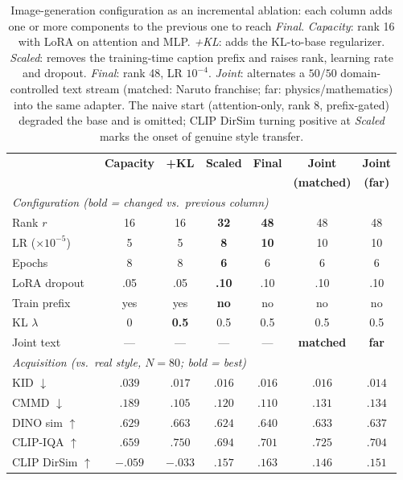 \begin{table}[t]
\centering\small
\setlength{\tabcolsep}{5pt}
\renewcommand{\arraystretch}{1.05}
\begin{tabular}{lcccccc}
\toprule
 & \textbf{Capacity} & \textbf{+KL} & \textbf{Scaled} & \textbf{Final} & \textbf{Joint} & \textbf{Joint} \\
 & & & & & \textbf{(matched)} & \textbf{(far)} \\
\midrule
\multicolumn{7}{l}{\textit{Configuration (bold = changed vs.\ previous column)}}\\
Rank $r$              & 16 & 16 & \textbf{32} & \textbf{48} & 48 & 48 \\
LR ($\times10^{-5}$)  & 5 & 5 & \textbf{8} & \textbf{10} & 10 & 10 \\
Epochs               & 8 & 8 & \textbf{6} & 6 & 6 & 6 \\
LoRA dropout         & .05 & .05 & \textbf{.10} & .10 & .10 & .10 \\
Train prefix         & yes & yes & \textbf{no} & no & no & no \\
KL $\lambda$         & 0 & \textbf{0.5} & 0.5 & 0.5 & 0.5 & 0.5 \\
Joint text           & --- & --- & --- & --- & \textbf{matched} & \textbf{far} \\
\midrule
\multicolumn{7}{l}{\textit{Acquisition (vs.\ real style, $N{=}80$; bold = best)}}\\
KID $\downarrow$       & $.039$ & $.017$ & $.016$ & $.016$ & $.016$ & $\mathbf{.014}$ \\
CMMD $\downarrow$      & $.189$ & $\mathbf{.105}$ & $.120$ & $.110$ & $.131$ & $.134$ \\
DINO sim $\uparrow$    & $.629$ & $\mathbf{.663}$ & $.624$ & $.640$ & $.633$ & $.637$ \\
CLIP-IQA $\uparrow$    & $.659$ & $\mathbf{.750}$ & $.694$ & $.701$ & $.725$ & $.704$ \\
CLIP DirSim $\uparrow$ & $-.059$ & $-.033$ & $.157$ & $\mathbf{.163}$ & $.146$ & $.151$ \\
\bottomrule
\end{tabular}
\caption{Image-generation configuration as an incremental ablation: each column
adds one or more components to the previous one to reach \textit{Final}.
\textit{Capacity}: rank 16 with LoRA on attention and MLP. \textit{+KL}: adds the
KL-to-base regularizer. \textit{Scaled}: removes the training-time caption prefix
and raises rank, learning rate and dropout. \textit{Final}: rank 48, LR
$10^{-4}$. \textit{Joint}: alternates a $50/50$ domain-controlled text stream
(matched: Naruto franchise; far: physics/mathematics) into the same adapter. The
naive start (attention-only, rank 8, prefix-gated) degraded the base and is
omitted; CLIP DirSim turning positive at \textit{Scaled} marks the onset of
genuine style transfer.}
\label{tab:panel}
\end{table}

